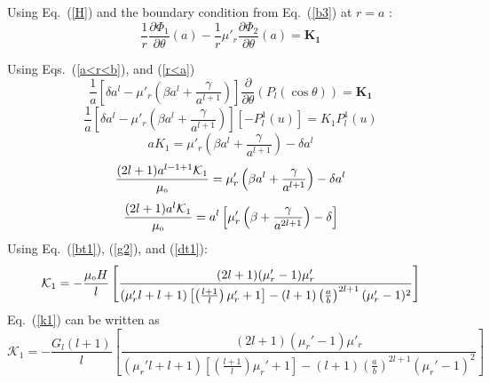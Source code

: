 Using Eq.~(\ref{H}) and the boundary condition from Eq.~(\ref{b3}) at $r=a$ :
$$\frac{1}{r}\frac{\partial \Phi_1}{\partial \theta}(a)-\frac{1}{r}\mu'_r\frac{\partial \Phi_2}{\partial \theta}(a)=\bm{K_1}  $$

Using Eqs.~(\ref{a<r<b}), and (\ref{r<a})
$$\frac{1}{a}\left[\delta a^l-\mu'_r\left(\beta a^l+\frac{\gamma}{a^{l+1}}\right)\right]\frac{\partial}{\partial \theta}(P_l(\cos\theta))= \bm{K_1}$$
$$\frac{1}{a}\left[\delta a^l-\mu'_r\left(\beta a^l+\frac{\gamma}{a^{l+1}}\right)\right][-P_l^1(u)]= K_1 P_l^1(u)$$
$$a K_1=\mu'_r\left(\beta a^l+\frac{\gamma}{a^{l+1}}\right)-\delta a^l$$
$$\frac{(2l+1)a^{l-1+1}\mathcal{K}_1}{\mu_{\scriptscriptstyle 0}}=\mu'_r\left(\beta a^l+\frac{\gamma}{a^{l+1}}\right)-\delta a^l$$
$$\frac{(2l+1)a^l\mathcal{K}_1}{\mu_{\scriptscriptstyle 0}}=a^l\left[\mu'_r\left(\beta +\frac{\gamma}{a^{2l+1}}\right)-\delta \right]$$
Using Eq.~(\ref{bt1}), (\ref{g2}), and (\ref{dt1}):
\begin{equation}\label{k1s}
\mathcal{K}_1=-\frac{\mu_{\scriptscriptstyle 0} H}{l}\left[\frac{(2l+1)(\mu_r'-1)\mu'_r}{(\mu_r'l+l+1)\left[\left(\frac{l+1}{l}\right)\mu_r'+1\right]-(l+1)\left(\frac{a}{b}\right)^{2l+1}(\mu_r'-1)^2}\right]
\end{equation}
Eq.~(\ref{k1}) can be written as
\begin{equation}\label{k1b}
\mathcal{K}_1=-\frac{G_l (l+1)}{l}\left[\frac{(2l+1)(\mu_r'-1)\mu'_r}{(\mu_r'l+l+1)\left[\left(\frac{l+1}{l}\right)\mu_r'+1\right]-(l+1)\left(\frac{a}{b}\right)^{2l+1}(\mu_r'-1)^2}\right]
\end{equation}

